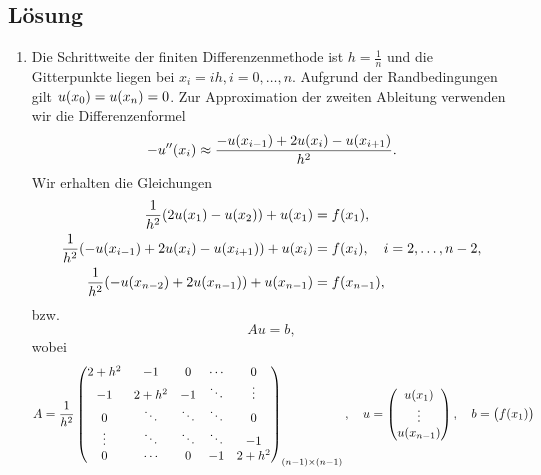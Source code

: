 \documentclass{exercise}
\begin{document}
    \subsection*{Lösung}
    \begin{enumerate}
        \item Die Schrittweite der finiten Differenzenmethode ist \(h = \frac{1}{n}\) und die Gitterpunkte liegen bei \(x_i = ih, i = 0, \ldots, n\).
        Aufgrund der Randbedingungen gilt \(u\parentheses*{x_0} = u\parentheses*{x_n} = 0\).
        Zur Approximation der zweiten Ableitung verwenden wir die Differenzenformel
        \[
            -u''\parentheses*{x_i} \approx \frac{-u\parentheses*{x_{i - 1}} + 2u\parentheses*{x_i} - u\parentheses*{x_{i + 1}}}{h^2}.
        \]
        Wir erhalten die Gleichungen
        \begin{align*}
            \frac{1}{h^2}\parentheses*{2u\parentheses*{x_1} - u\parentheses*{x_2}} + u\parentheses*{x_1} &= f\parentheses*{x_1},\\
            \frac{1}{h^2}\parentheses*{-u\parentheses*{x_{i - 1}} + 2u\parentheses*{x_i} - u\parentheses*{x_{i + 1}}} + u\parentheses*{x_i} &= f\parentheses*{x_i}, \quad i = 2, \ldots, n - 2,\\
            \frac{1}{h^2}\parentheses*{-u\parentheses*{x_{n - 2}} + 2u\parentheses*{x_{n - 1}}} + u\parentheses*{x_{n - 1}} &= f\parentheses*{x_{n - 1}},
        \end{align*}
        bzw.
        \[
            Au = b,
        \]
        wobei
        \[
            A = \frac{1}{h^2}\begin{pmatrix}
                2 + h^2 & -1 & 0 & \cdots & 0\\
                -1 & 2 + h^2 & -1 & \ddots & \vdots\\
                0 & \ddots & \ddots & \ddots & 0\\
                \vdots & \ddots & \ddots & \ddots & -1\\
                0 & \cdots & 0 & -1 & 2 + h^2
            \end{pmatrix}_{\parentheses*{n - 1} \times \parentheses*{n - 1}}, \quad u = \begin{pmatrix}
                u\parentheses*{x_1}\\
                \vdots\\
                u\parentheses*{x_{n - 1}}
            \end{pmatrix}, \quad b = \begin{pmatrix}
                f\parentheses*{x_1}\\

\end{pmatrix}\]
\end{enumerate}
\end{document}
